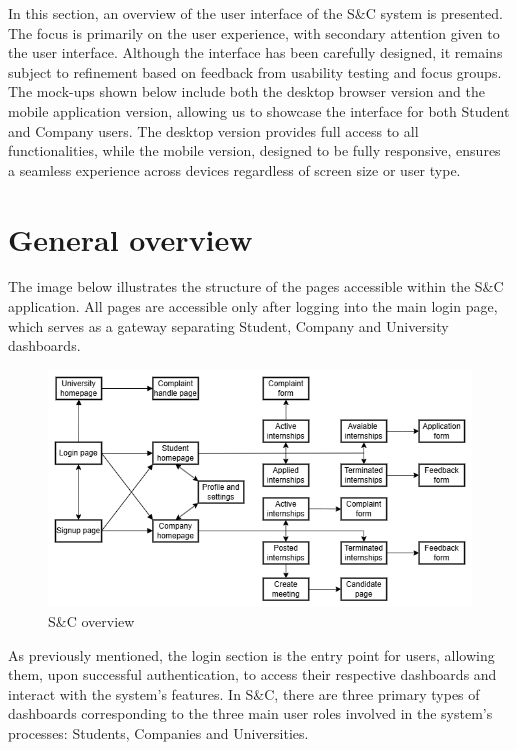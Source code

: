 In this section, an overview of the user interface of the S\&C system is presented.
The focus is primarily on the user experience, with secondary attention given to the user interface. Although the interface has been carefully designed, it remains subject to refinement based on feedback from usability testing and focus groups.
The mock-ups shown below include both the desktop browser version and the mobile application version, allowing us to showcase the interface for both Student and Company users. The desktop version provides full access to all functionalities, while the mobile version, designed to be fully responsive, ensures a seamless experience across devices regardless of screen size or user type.

\section{General overview}
The image below illustrates the structure of the pages accessible within the S\&C application.
All pages are accessible only after logging into the main login page, which serves as a gateway separating Student, Company and University dashboards.

\begin{figure}[H]
    \centering
        \includegraphics[width=1\linewidth]{Images/Mock-up/User interface overview.png}
    \caption{S\&C overview}
    \label{fig:homepage-design}
\end{figure}

As previously mentioned, the login section is the entry point for users, allowing them, upon successful authentication, to access their respective dashboards and interact with the system’s features. In S\&C, there are three primary types of dashboards corresponding to the three main user roles involved in the system’s processes: Students, Companies and Universities.

